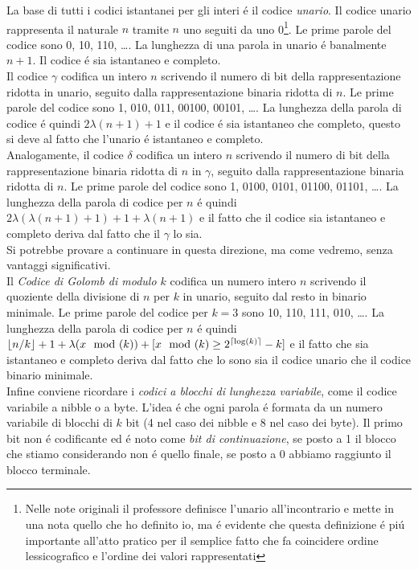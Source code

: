 
\noindent La base di tutti i codici istantanei per gli interi é il codice \textit{unario}. Il codice unario rappresenta il naturale $n$ tramite $n$ uno seguiti da uno 0\footnote{Nelle note originali il professore definisce l'unario all'incontrario e mette in una nota quello che ho definito io, ma é evidente che questa definizione é piú importante all'atto pratico per il semplice fatto che fa coincidere ordine lessicografico e l'ordine dei valori rappresentati}. Le prime parole del codice sono 0, 10, 110, \dots. La lunghezza di una parola in unario é banalmente $n + 1$. Il codice é sia istantaneo e completo.\\
Il codice $\gamma$ %
codifica un intero $n$ scrivendo il numero di bit della rappresentazione ridotta in unario, seguito dalla rappresentazione binaria ridotta di $n$. Le prime parole del codice sono 1, 010, 011, 00100, 00101, \dots. La lunghezza della parola di codice é quindi $2\lambda(n + 1) + 1$ e il codice é sia istantaneo che completo, questo si deve al fatto che l'unario é istantaneo e completo.\\
Analogamente, il codice $\delta$ %
codifica un intero $n$ scrivendo il numero di bit della rappresentazione binaria ridotta di $n$ in $\gamma$, seguito dalla rappresentazione binaria ridotta di $n$. Le prime parole del codice sono 1, 0100, 0101, 01100, 01101, \dots. La lunghezza della parola di codice per $n$ é quindi $2\lambda(\lambda(n + 1) + 1) + 1 + \lambda(n + 1)$ e il fatto che il codice sia istantaneo e completo deriva dal fatto che il $\gamma$ lo sia.\\
Si potrebbe provare a continuare in questa direzione, ma come vedremo, senza vantaggi significativi.\\
Il \textit{Codice di Golomb di modulo $k$} %
codifica un numero intero $n$ scrivendo il quoziente della divisione di $n$ per $k$ in unario, seguito dal resto in binario minimale. Le prime parole del codice per $k = 3$ sono 10, 110, 111, 010, \dots. La lunghezza della parola di codice per $n$ é quindi $\left\lfloor n/k \right\rfloor + 1 + \lambda(x\mod(k)) + [x\mod(k) \geq 2^{\left\lceil \log(k) \right\rceil} - k]$ e il fatto che sia istantaneo e completo deriva dal fatto che lo sono sia il codice unario che il codice binario minimale.\\
Infine conviene ricordare i \textit{codici a blocchi di lunghezza variabile}, come il codice variabile a nibble o a byte. L'idea é che ogni parola é formata da un numero variabile di blocchi di $k$ bit (4 nel caso dei nibble e 8 nel caso dei byte). Il primo bit non é codificante ed é noto come \textit{bit di continuazione}, se posto a 1 il blocco che stiamo considerando non é quello finale, se posto a 0 abbiamo raggiunto il blocco terminale.\\
